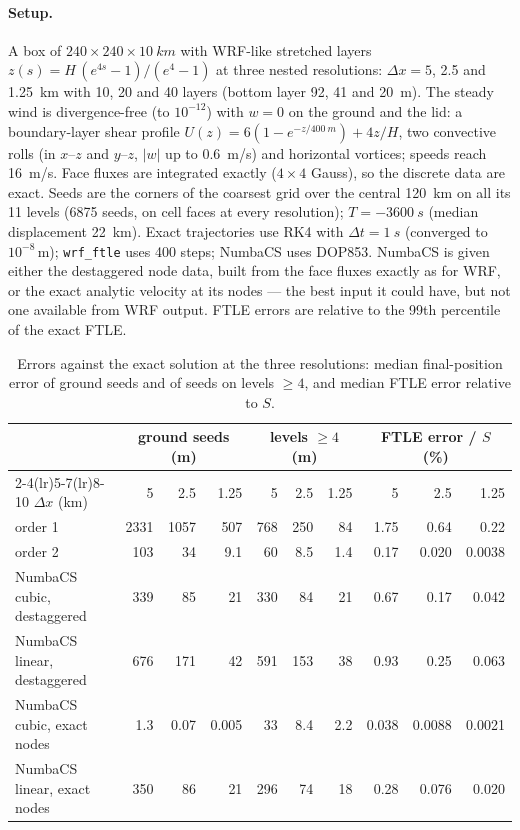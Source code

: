 \documentclass[11pt,a4paper]{article}
\begin{document}
\paragraph{Setup.} A box of $240\times240\times\SI{10}{km}$ with WRF-like
stretched layers $z(s)=H\,(e^{4s}-1)/(e^4-1)$ at three nested resolutions:
$\Delta x=5$, 2.5 and \SI{1.25}{km} with 10, 20 and 40 layers (bottom layer
92, 41 and \SI{20}{m}). The steady wind is divergence-free (to $10^{-12}$) with
$w=0$ on the ground and the lid: a boundary-layer shear profile
$U(z)=6(1-e^{-z/\SI{400}{m}})+4z/H$, two convective rolls (in $x$--$z$ and
$y$--$z$, $|w|$ up to \SI{0.6}{m/s}) and horizontal vortices; speeds reach
\SI{16}{m/s}. Face fluxes are integrated exactly ($4\times4$ Gauss), so the
discrete data are exact. Seeds are the corners of the coarsest grid over the
central \SI{120}{km} on all its 11 levels (6875 seeds, on cell faces at every
resolution); $T=\SI{-3600}{s}$ (median displacement \SI{22}{km}). Exact
trajectories use RK4 with $\Delta t=\SI{1}{s}$ (converged to $10^{-8}$\,m);
\texttt{wrf\_ftle} uses 400 steps; NumbaCS uses DOP853. NumbaCS is given either
the destaggered node data, built from the face fluxes exactly as for WRF, or
the exact analytic velocity at its nodes --- the best input it could have, but
not one available from WRF output. FTLE errors are relative to the 99th
percentile of the exact FTLE.

\begin{table}[t]
  \centering
  \caption{Errors against the exact solution at the three resolutions:
  median final-position error of ground seeds and of seeds on levels $\ge4$,
  and median FTLE error relative to $S$.}
  \label{tab:bench}
  \small
  \begin{tabular}{lrrrrrrrrr}
    \toprule
     & \multicolumn{3}{c}{ground seeds (m)} & \multicolumn{3}{c}{levels $\ge4$ (m)} & \multicolumn{3}{c}{FTLE error / $S$ (\%)} \\
    \cmidrule(lr){2-4}\cmidrule(lr){5-7}\cmidrule(lr){8-10}
    $\Delta x$ (km) & 5 & 2.5 & 1.25 & 5 & 2.5 & 1.25 & 5 & 2.5 & 1.25 \\
    \midrule
    order 1                         & 2331 & 1057 & 507  & 768 & 250 & 84  & 1.75 & 0.64 & 0.22 \\
    order 2                         & 103  & 34   & 9.1  & 60  & 8.5 & 1.4 & 0.17 & 0.020 & 0.0038 \\
    NumbaCS cubic, destaggered      & 339  & 85   & 21   & 330 & 84  & 21  & 0.67 & 0.17 & 0.042 \\
    NumbaCS linear, destaggered     & 676  & 171  & 42   & 591 & 153 & 38  & 0.93 & 0.25 & 0.063 \\
    \midrule
    NumbaCS cubic, exact nodes      & 1.3  & 0.07 & 0.005 & 33 & 8.4 & 2.2 & 0.038 & 0.0088 & 0.0021 \\
    NumbaCS linear, exact nodes     & 350  & 86   & 21   & 296 & 74  & 18  & 0.28 & 0.076 & 0.020 \\
    \bottomrule
  \end{tabular}
\end{table}
\end{document}
